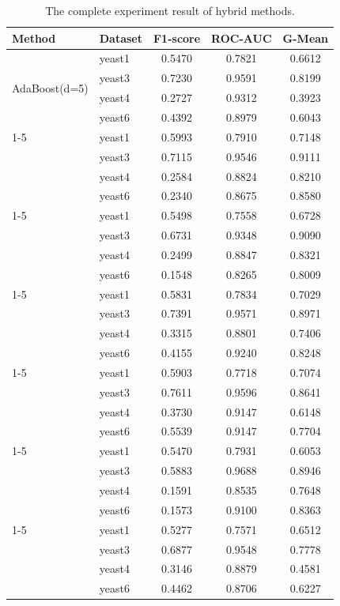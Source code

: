 \documentclass[sigconf]{acmart}
\begin{document}
\begin{table}[h]
  \centering
  \caption{The complete experiment result of hybrid methods.}
  \label{tab:hybrid_summary}
  \small
  \begin{tabular}{llccc}
    \toprule
    \textbf{Method} & \textbf{Dataset} & \textbf{F1-score} & \textbf{ROC-AUC} & \textbf{G-Mean} \\
    \midrule
    \multirow{4}{*}{AdaBoost(d=5)} & yeast1 & 0.5470 & 0.7821 & 0.6612 \\
    & yeast3 & 0.7230 & 0.9591 & 0.8199 \\
    & yeast4 & 0.2727 & 0.9312 & 0.3923 \\
    & yeast6 & 0.4392 & 0.8979 & 0.6043 \\
    \cmidrule{1-5}
    \multirow{4}{*}{RHSBoost} & yeast1 & 0.5993 & 0.7910 & 0.7148 \\
    & yeast3 & 0.7115 & 0.9546 & 0.9111 \\
    & yeast4 & 0.2584 & 0.8824 & 0.8210 \\
    & yeast6 & 0.2340 & 0.8675 & 0.8580 \\
    \cmidrule{1-5}
    \multirow{4}{*}{RUSBoost} & yeast1 & 0.5498 & 0.7558 & 0.6728 \\
    & yeast3 & 0.6731 & 0.9348 & 0.9090 \\
    & yeast4 & 0.2499 & 0.8847 & 0.8321 \\
    & yeast6 & 0.1548 & 0.8265 & 0.8009 \\
    \cmidrule{1-5}
    \multirow{4}{*}{SMOTE} & yeast1 & 0.5831 & 0.7834 & 0.7029 \\
    & yeast3 & 0.7391 & 0.9571 & 0.8971 \\
    & yeast4 & 0.3315 & 0.8801 & 0.7406 \\
    & yeast6 & 0.4155 & 0.9240 & 0.8248 \\
    \cmidrule{1-5}
    \multirow{4}{*}{SMOTEBoost} & yeast1 & 0.5903 & 0.7718 & 0.7074 \\
    & yeast3 & 0.7611 & 0.9596 & 0.8641 \\
    & yeast4 & 0.3730 & 0.9147 & 0.6148 \\
    & yeast6 & 0.5539 & 0.9147 & 0.7704 \\
    \cmidrule{1-5}
    \multirow{4}{*}{SMOTECSL} & yeast1 & 0.5470 & 0.7931 & 0.6053 \\
    & yeast3 & 0.5883 & 0.9688 & 0.8946 \\
    & yeast4 & 0.1591 & 0.8535 & 0.7648 \\
    & yeast6 & 0.1573 & 0.9100 & 0.8363 \\
    \cmidrule{1-5}
    \multirow{4}{*}{SUBoost} & yeast1 & 0.5277 & 0.7571 & 0.6512 \\
    & yeast3 & 0.6877 & 0.9548 & 0.7778 \\
    & yeast4 & 0.3146 & 0.8879 & 0.4581 \\
    & yeast6 & 0.4462 & 0.8706 & 0.6227 \\
    \bottomrule
  \end{tabular}
\end{table}
\end{document}
